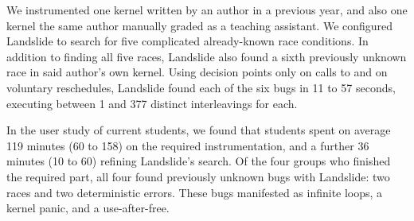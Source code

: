We instrumented one kernel written by an author in a previous year, and also one kernel the same author manually graded as a teaching assistant.
We configured Landslide to search for five complicated already-known race conditions.
In addition to finding all five races, Landslide also found a sixth previously unknown race in said author's own kernel.
Using decision points only on calls to  and on voluntary reschedules, Landslide found each of the six bugs in 11 to 57 seconds, executing between 1 and 377 distinct interleavings for each.

In the user study of current students, we found that students spent on average 119 minutes (60 to 158) on the required instrumentation, and a further 36 minutes (10 to 60) refining Landslide's search.
Of the four groups who finished the required part, all four found previously unknown bugs with Landslide: two races and two deterministic errors.
These bugs manifested as infinite loops, a kernel panic, and a use-after-free.



